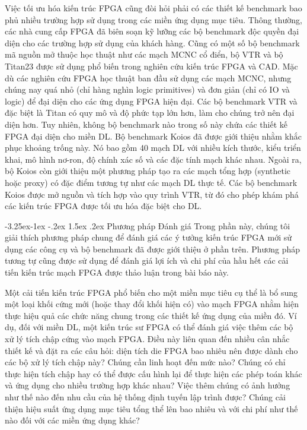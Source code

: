 \documentclass[a4paper]{article}
\makeatletter
\newcounter {subsubsubsection}[subsubsection]
\newcommand\subsubsubsection{\@startsection{subsubsubsection}{4}{\z@}%
                                     {-3.25ex\@plus -1ex \@minus -.2ex}%
                                     {1.5ex \@plus .2ex}%
                                     {\normalfont\normalsize\bfseries}}
\makeatother
\begin{document}
Việc tối ưu hóa kiến trúc FPGA cũng đòi hỏi phải có các thiết kế benchmark bao phủ nhiều trường hợp sử dụng trong các miền ứng dụng mục tiêu. Thông thường, các nhà cung cấp FPGA đã biên soạn kỹ lưỡng các bộ benchmark độc quyền đại diện cho các trường hợp sử dụng của khách hàng. Cũng có một số bộ benchmark mã nguồn mở thuộc học thuật như các mạch MCNC cổ điển, bộ VTR và bộ Titan23 được sử dụng phổ biến trong nghiên cứu kiến trúc FPGA và CAD. Mặc dù các nghiên cứu FPGA học thuật ban đầu sử dụng các mạch MCNC, nhưng chúng nay quá nhỏ (chỉ hàng nghìn logic primitives) và đơn giản (chỉ có IO và logic) để đại diện cho các ứng dụng FPGA hiện đại. Các bộ benchmark VTR và đặc biệt là Titan có quy mô và độ phức tạp lớn hơn, làm cho chúng trở nên đại diện hơn. Tuy nhiên, không bộ benchmark nào trong số này chứa các thiết kế FPGA đại diện cho miền DL. Bộ benchmark Koios đã được giới thiệu nhằm khắc phục khoảng trống này. Nó bao gồm 40 mạch DL với nhiều kích thước, kiểu triển khai, mô hình nơ-ron, độ chính xác số và các đặc tính mạch khác nhau. Ngoài ra, bộ Koios còn giới thiệu một phương pháp tạo ra các mạch tổng hợp (synthetic hoặc proxy) có đặc điểm tương tự như các mạch DL thực tế. Các bộ benchmark Koios được mở nguồn và tích hợp vào quy trình VTR, từ đó cho phép khám phá các kiến trúc FPGA được tối ưu hóa đặc biệt cho DL.

\subsubsubsection{Phương pháp Đánh giá}
Trong phần này, chúng tôi giải thích phương pháp chung để đánh giá các ý tưởng kiến trúc FPGA mới sử dụng các công cụ và bộ benchmark đã được giới thiệu ở phần trên. Phương pháp tương tự cũng được sử dụng để đánh giá lợi ích và chi phí của hầu hết các cải tiến kiến trúc mạch FPGA được thảo luận trong bài báo này.

Một cải tiến kiến trúc FPGA phổ biến cho một miền mục tiêu cụ thể là bổ sung một loại khối cứng mới (hoặc thay đổi khối hiện có) vào mạch FPGA nhằm hiện thực hiệu quả các chức năng chung trong các thiết kế ứng dụng của miền đó. Ví dụ, đối với miền DL, một kiến trúc sư FPGA có thể đánh giá việc thêm các bộ xử lý tích chập cứng vào mạch FPGA. Điều này liên quan đến nhiều cân nhắc thiết kế và đặt ra các câu hỏi: diện tích die FPGA bao nhiêu nên được dành cho các bộ xử lý tích chập này? Chúng cần linh hoạt đến mức nào? Chúng có chỉ thực hiện tích chập hay có thể được cấu hình lại để thực hiện các phép toán khác và ứng dụng cho nhiều trường hợp khác nhau? Việc thêm chúng có ảnh hưởng như thế nào đến nhu cầu của hệ thống định tuyến lập trình được? Chúng cải thiện hiệu suất ứng dụng mục tiêu tổng thể lên bao nhiêu và với chi phí như thế nào đối với các miền ứng dụng khác?
\end{document}
